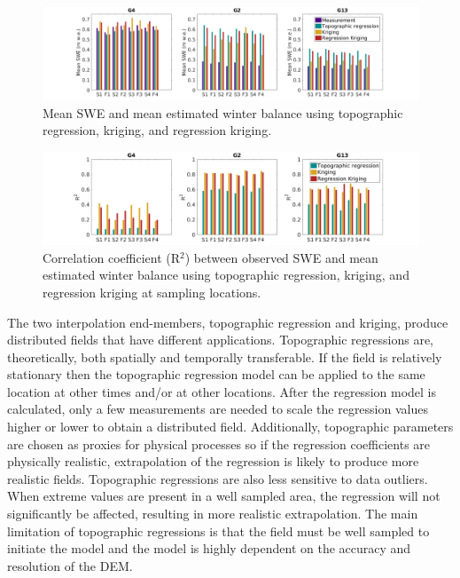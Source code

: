 \documentclass[12pt]{article}
\begin{document}
\begin{landscape}
\begin{figure}
	\includegraphics[height=0.38\textwidth]{InterpMethod_allopts.png}%
	\caption{Mean SWE and mean estimated winter balance using topographic regression, kriging, and regression kriging.}
	\label{fig:InterpMethod_allopts}
\end{figure}

\begin{figure}
	\includegraphics[height=0.38\textwidth]{InterpMethod_alloptsR2.png}%
	\caption{Correlation coefficient (R$^2$) between observed SWE and mean estimated winter balance using topographic regression, kriging, and regression kriging at sampling locations.}
	\label{fig:InterpMethod_alloptsR2}
\end{figure}
\end{landscape}

The two interpolation end-members, topographic regression and kriging, produce distributed fields that have different applications. Topographic regressions are, theoretically, both spatially and temporally transferable. If the field is relatively stationary then the topographic regression model can be applied to the same location at other times and/or at other locations. After the regression model is calculated, only a few measurements are needed to scale the regression values higher or lower to obtain a distributed field. Additionally, topographic parameters are chosen as proxies for physical processes so if the regression coefficients are physically realistic, extrapolation of the regression is likely to produce more realistic fields. Topographic regressions are also less sensitive to data outliers. When extreme values are present in a well sampled area, the regression will not significantly be affected, resulting in more realistic extrapolation. The main limitation of topographic regressions is that the field must be well sampled to initiate the model and the model is highly dependent on the accuracy and resolution of the DEM. 
\end{document}
